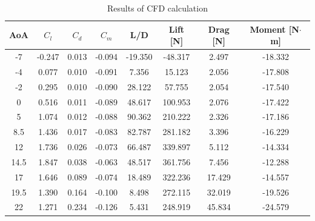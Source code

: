 
\begin{table}[H]
\centering
\caption{Results of CFD calculation}
\begin{tabular}{|c|c|c|c|c|c|c|c|}
\hline
AoA  & $C_l$     & $C_d$    & $C_m$     & L/D     & Lift [N]    & Drag [N]   & Moment [N$\cdot$m]  \\ \hline \hline
-7   & -0.247 & 0.013 & -0.094 & -19.350 & -48.317 & 2.497  & -18.332 \\ \hline
-4   & 0.077  & 0.010 & -0.091 & 7.356   & 15.123  & 2.056  & -17.808 \\ \hline
-2   & 0.295  & 0.010 & -0.090 & 28.122  & 57.755  & 2.054  & -17.540 \\ \hline
0    & 0.516  & 0.011 & -0.089 & 48.617  & 100.953 & 2.076  & -17.422 \\ \hline
5    & 1.074  & 0.012 & -0.088 & 90.362  & 210.222 & 2.326  & -17.186 \\ \hline
8.5  & 1.436  & 0.017 & -0.083 & 82.787  & 281.182 & 3.396  & -16.229 \\ \hline
12   & 1.736  & 0.026 & -0.073 & 66.487  & 339.897 & 5.112  & -14.334 \\ \hline
14.5 & 1.847  & 0.038 & -0.063 & 48.517  & 361.756 & 7.456  & -12.288 \\ \hline
17   & 1.646  & 0.089 & -0.074 & 18.489  & 322.236 & 17.429 & -14.557 \\ \hline
19.5 & 1.390  & 0.164 & -0.100 & 8.498   & 272.115 & 32.019 & -19.526 \\ \hline
22   & 1.271  & 0.234 & -0.126 & 5.431   & 248.919 & 45.834 & -24.579 \\ \hline
\end{tabular}
\end{table}

